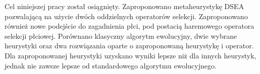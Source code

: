 \documentclass[./FM_mgr.tex]{subfiles}
\begin{document}
Cel niniejszej pracy został osiągnięty.
Zaproponowano metaheurystykę DSEA pozwalającą na użycie dwóch oddzielnych operatorów selekcji. 
Zaproponowano również nowe podejście do zagadnienia płci, pod postacią haremowego operatora selekcji płciowej.
Porównano klasyczny algorytm ewolucyjny, dwie wybrane heurystyki oraz dwa rozwiązania oparte o zaproponowaną heurystykę i operator.
Dla zaproponowanej heurystyki uzyskano wyniki lepsze niż dla innych heurystyk, jednak nie zawsze lepsze od standardowego algorytmu ewolucyjnego.
\end{document}
